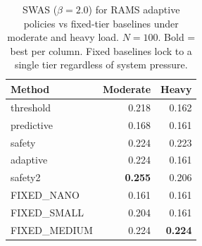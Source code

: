 \begin{table}[t]
\centering
\caption{SWAS ($\beta=2.0$) for RAMS adaptive policies vs fixed-tier baselines under moderate and heavy load. $N=100$. Bold = best per column. Fixed baselines lock to a single tier regardless of system pressure.}
\label{tab:exp7d_baselines}
\begin{tabular}{lrr}
\toprule
Method & Moderate & Heavy \\
\midrule
  threshold & 0.218 & 0.162 \\
  predictive & 0.168 & 0.161 \\
  safety & 0.224 & 0.223 \\
  adaptive & 0.224 & 0.161 \\
  safety2 & \textbf{0.255} & 0.206 \\
\midrule
  FIXED_NANO & 0.161 & 0.161 \\
  FIXED_SMALL & 0.204 & 0.161 \\
  FIXED_MEDIUM & 0.224 & \textbf{0.224} \\
\bottomrule
\end{tabular}
\end{table}